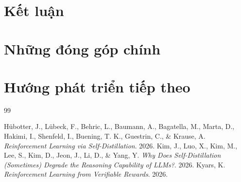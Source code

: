 \documentclass[12pt,a4paper]{report}
\begin{document}
\section{Kết luận}
\section{Những đóng góp chính}
\section{Hướng phát triển tiếp theo}

\begin{thebibliography}{99}
Hübotter, J., Lübeck, F., Behric, L., Baumann, A., Bagatella, M., Marta, D., Hakimi, I., Shenfeld, I., Buening, T. K., Guestrin, C., \& Krause, A. \textit{Reinforcement Learning via Self-Distillation}. 2026.
Kim, J., Luo, X., Kim, M., Lee, S., Kim, D., Jeon, J., Li, D., \& Yang, Y. \textit{Why Does Self-Distillation (Sometimes) Degrade the Reasoning Capability of LLMs?}. 2026.
Kyars, K. \textit{Reinforcement Learning from Verifiable Rewards}. 2026.
\end{thebibliography}
\end{document}
